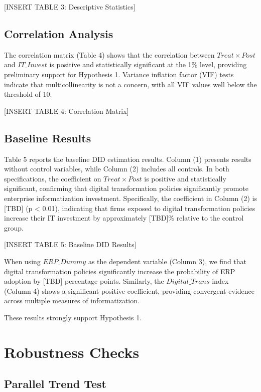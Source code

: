 \documentclass[12pt]{article}
\begin{document}
[INSERT TABLE 3: Descriptive Statistics]

\subsection{Correlation Analysis}

The correlation matrix (Table 4) shows that the correlation between $Treat \times Post$ and $IT\_Invest$ is positive and statistically significant at the 1\% level, providing preliminary support for Hypothesis 1. Variance inflation factor (VIF) tests indicate that multicollinearity is not a concern, with all VIF values well below the threshold of 10.

[INSERT TABLE 4: Correlation Matrix]

\subsection{Baseline Results}

Table 5 reports the baseline DID estimation results. Column (1) presents results without control variables, while Column (2) includes all controls. In both specifications, the coefficient on $Treat \times Post$ is positive and statistically significant, confirming that digital transformation policies significantly promote enterprise informatization investment. Specifically, the coefficient in Column (2) is [TBD] (p < 0.01), indicating that firms exposed to digital transformation policies increase their IT investment by approximately [TBD]\% relative to the control group.

[INSERT TABLE 5: Baseline DID Results]

When using $ERP\_Dummy$ as the dependent variable (Column 3), we find that digital transformation policies significantly increase the probability of ERP adoption by [TBD] percentage points. Similarly, the $Digital\_Trans$ index (Column 4) shows a significant positive coefficient, providing convergent evidence across multiple measures of informatization.

These results strongly support Hypothesis 1.

\section{Robustness Checks}

\subsection{Parallel Trend Test}
\end{document}
